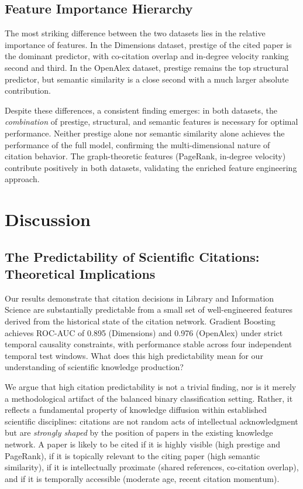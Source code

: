 \documentclass[12pt,a4paper]{article}
\begin{document}
\subsection{Feature Importance Hierarchy}

The most striking difference between the two datasets lies in the relative
importance of features. In the Dimensions dataset, prestige of the cited paper is
the dominant predictor, with co-citation overlap and in-degree velocity ranking
second and third. In the OpenAlex dataset, prestige remains the top structural
predictor, but semantic similarity is a close second with a much larger absolute
contribution.

Despite these differences, a consistent finding emerges: in both datasets, the
\textit{combination} of prestige, structural, and semantic features is necessary
for optimal performance. Neither prestige alone nor semantic similarity alone
achieves the performance of the full model, confirming the multi-dimensional nature
of citation behavior. The graph-theoretic features (PageRank, in-degree velocity)
contribute positively in both datasets, validating the enriched feature engineering
approach.

\section{Discussion}
\label{sec:discussion}

\subsection{The Predictability of Scientific Citations: Theoretical Implications}

Our results demonstrate that citation decisions in Library and Information Science
are substantially predictable from a small set of well-engineered features derived
from the historical state of the citation network. Gradient Boosting achieves
ROC-AUC of 0.895 (Dimensions) and 0.976 (OpenAlex) under strict temporal causality
constraints, with performance stable across four independent temporal test windows.
What does this high predictability mean for our understanding of scientific
knowledge production?

We argue that high citation predictability is not a trivial finding, nor is it
merely a methodological artifact of the balanced binary classification setting.
Rather, it reflects a fundamental property of knowledge diffusion within established
scientific disciplines: citations are not random acts of intellectual acknowledgment
but are \textit{strongly shaped} by the position of papers in the existing
knowledge network. A paper is likely to be cited if it is highly visible (high
prestige and PageRank), if it is topically relevant to the citing paper (high
semantic similarity), if it is intellectually proximate (shared references,
co-citation overlap), and if it is temporally accessible (moderate age, recent
citation momentum).
\end{document}
